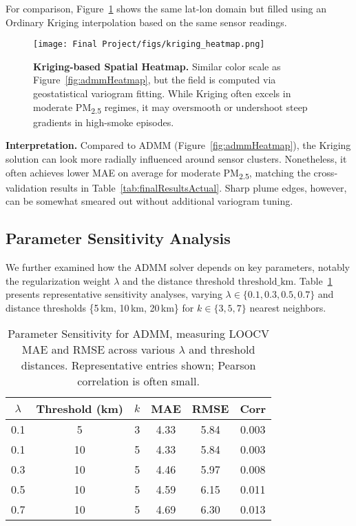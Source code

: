 \documentclass[12pt]{article}                                %
\begin{document}
For comparison, Figure~\ref{fig:krigHeatmap} shows the same lat-lon domain but filled using an Ordinary Kriging interpolation based on the same sensor readings.

\begin{figure}[H]  %
    \centering
    \texttt{[image: Final Project/figs/kriging\_heatmap.png]}
    \caption{\textbf{Kriging-based Spatial Heatmap.}
    Similar color scale as Figure~\ref{fig:admmHeatmap}, but the field is computed via geostatistical variogram fitting. 
    While Kriging often excels in moderate PM\textsubscript{2.5} regimes, it may oversmooth or undershoot steep gradients in high-smoke episodes.}
    \label{fig:krigHeatmap}
\end{figure}

\noindent
\textbf{Interpretation.}
Compared to ADMM (Figure~\ref{fig:admmHeatmap}), the Kriging solution can look more radially influenced around sensor clusters. Nonetheless, it often achieves lower MAE on average for moderate PM\textsubscript{2.5}, matching the cross‐validation results in Table~\ref{tab:finalResultsActual}. 
Sharp plume edges, however, can be somewhat smeared out without additional variogram tuning.

\subsection{Parameter Sensitivity Analysis}
\label{sec:paramsensitivity}     %

We further examined how the ADMM solver depends on key parameters, notably the regularization 
weight $\lambda$ and the distance threshold $\mathrm{threshold\_km}$. 
Table~\ref{tab:admmSensitivity} presents representative sensitivity analyses, varying 
$\lambda \in \{0.1, 0.3, 0.5, 0.7\}$ and distance thresholds \{5\,km, 10\,km, 20\,km\} 
for $k\in\{3,5,7\}$ nearest neighbors.

\begin{table}[!ht]
\centering
\caption{Parameter Sensitivity for ADMM, measuring LOOCV MAE and RMSE across various 
\(\lambda\) and threshold distances. Representative entries shown; Pearson correlation 
is often small.}
\label{tab:admmSensitivity}
\begin{tabular}{cccccc}
\toprule
\(\lambda\) & Threshold (km) & \(k\) & MAE & RMSE & Corr\\
\midrule
0.1 &  5  & 3 & 4.33 & 5.84 & 0.003 \\
0.1 & 10  & 5 & 4.33 & 5.84 & 0.003 \\
0.3 & 10  & 5 & 4.46 & 5.97 & 0.008 \\
0.5 & 10  & 5 & 4.59 & 6.15 & 0.011 \\
0.7 & 10  & 5 & 4.69 & 6.30 & 0.013 \\
\bottomrule
\end{tabular}
\end{table}
\end{document}
